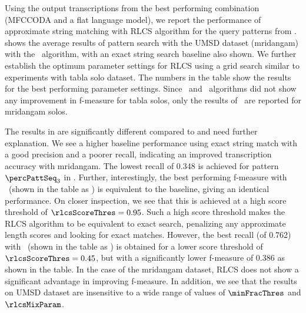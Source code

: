 Using the output transcriptions from the best performing combination (\acrshort{MFCCODA} and a flat language model), we report the performance of approximate string matching with \gls{RLCS} algorithm for the query patterns from .  shows the average results of pattern search with the \acrshort{UMSD} dataset (mridangam) with the \rlcso\ algorithm, with an exact string search baseline also shown. We further establish the optimum parameter settings for \gls{RLCS} using a grid search similar to experiments with \gls{tabla} solo dataset. The numbers in the table show the results for the best performing parameter settings. Since \rlcsd\ and \rlcss\ algorithms did not show any improvement in f-measure for \gls{tabla} solos, only the results of \rlcso\ are reported for mridangam solos. 

The results in  are significantly different compared to  and need further explanation. We see a higher baseline performance using exact string match with a good precision and a poorer recall, indicating an improved transcription accuracy with mridangam. The lowest recall of 0.348 is achieved for pattern $\percPattSeq_3$ in . Further, interestingly, the best performing f-measure with \rlcso\ (shown in the table as ) is equivalent to the baseline, giving an identical performance. On closer inspection, we see that this is achieved at a high score threshold of $\rlcsScoreThres = 0.95$. Such a high score threshold makes the \gls{RLCS} algorithm to be equivalent to exact search, penalizing any approximate length scores and looking for exact matches. However, the best recall (of 0.762) with \rlcso\ (shown in the table as ) is obtained for a lower score threshold of $\rlcsScoreThres = 0.45$, but with a significantly lower f-measure of 0.386 as shown in the table. In the case of the mridangam dataset, \gls{RLCS} does not show a significant advantage in improving f-measure. In addition, we see that the results on \acrshort{UMSD} dataset are insensitive to a wide range of values of $\minFracThres$ and	$\rlcsMixParam$. 

